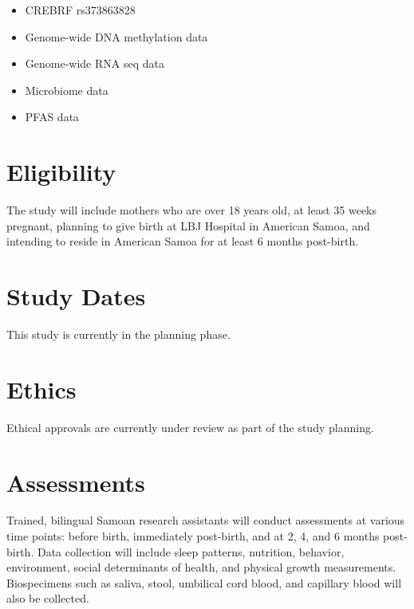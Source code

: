 \documentclass[
  letterpaper,
  DIV=11,
  numbers=noendperiod]{scrreprt}
\providecommand{\tightlist}{%
  \setlength{\itemsep}{0pt}\setlength{\parskip}{0pt}}\usepackage{longtable,booktabs,array}
\begin{document}

\begin{itemize}
\tightlist
\item
  CREBRF rs373863828
\item
  Genome-wide DNA methylation data
\item
  Genome-wide RNA seq data
\item
  Microbiome data
\item
  PFAS data
\end{itemize}

\section*{Eligibility}\label{eligibility-1}


The study will include mothers who are over 18 years old, at least 35
weeks pregnant, planning to give birth at LBJ Hospital in American
Samoa, and intending to reside in American Samoa for at least 6 months
post-birth.

\section*{Study Dates}\label{study-dates-1}


This study is currently in the planning phase.

\section*{Ethics}\label{ethics-1}


Ethical approvals are currently under review as part of the study
planning.

\section*{Assessments}\label{assessments-1}


Trained, bilingual Samoan research assistants will conduct assessments
at various time points: before birth, immediately post-birth, and at 2,
4, and 6 months post-birth. Data collection will include sleep patterns,
nutrition, behavior, environment, social determinants of health, and
physical growth measurements. Biospecimens such as saliva, stool,
umbilical cord blood, and capillary blood will also be collected.
\end{document}
